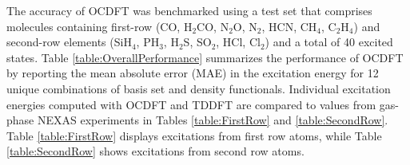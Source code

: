 \documentclass[8.5pt,twoside,twocolumn]{article}
\begin{document}
The accuracy of OCDFT was benchmarked using a test set that comprises molecules containing first-row (CO, H$_2$CO, N$_2$O, N$_2$, HCN, CH$_4$, C$_2$H$_4$) and second-row elements (SiH$_4$, PH$_3$, H$_2$S, SO$_2$, HCl, Cl$_2$) and a total of 40 excited states. 
Table \ref{table:OverallPerformance} summarizes the performance of OCDFT by reporting the mean absolute error (MAE) in the excitation energy for 12 unique combinations of basis set and density functionals.
Individual excitation energies computed with OCDFT and TDDFT are compared to values from gas-phase NEXAS experiments \cite{puttner_vibrationally_1999,remmers_high-resolution_1992,chen_k-shell_1989,tronc_nitrogen_1980,tronc_carbon_1979,francis_studies_1994,adachi_vibronic_1999,hitchcock_k-shell_1979,domke_carbon_1990,nayandin_angle-resolved_2001,bodeur_single-and_1990,gedat_s_1998,hudson_high-resolution_1994,cavell_chemical_1999,bodeur_photoabsorption_1985} in Tables \ref{table:FirstRow} and \ref{table:SecondRow}. Table \ref{table:FirstRow} displays excitations from first row atoms, while Table \ref{table:SecondRow} shows excitations from second row atoms.
\end{document}
